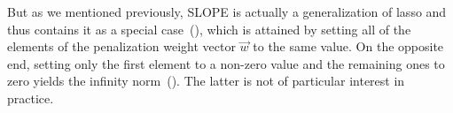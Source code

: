 But as we mentioned previously, SLOPE is actually a generalization of lasso and thus contains it as a special case~(), which is attained by setting all of the elements of the penalization weight vector \(\vec{w}\) to the same value. On the opposite end, setting only the first element to a non-zero value and the remaining ones to zero yields the infinity norm~(). The latter is not of particular interest in practice.

\begin{figure}[htpb]
  \centering
  \hfill%
  \hfill%
  \hfill%
\end{figure}

